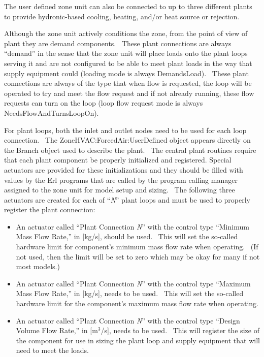 The user defined zone unit can also be connected to up to three different plants to provide hydronic-based cooling, heating, and/or heat source or rejection.

Although the zone unit actively conditions the zone, from the point of view of plant they are demand components.~ These plant connections are always ``demand'' in the sense that the zone unit will place loads onto the plant loops serving it and are not configured to be able to meet plant loads in the way that supply equipment could (loading mode is always DemandsLoad).~ These plant connections are always of the type that when flow is requested, the loop will be operated to try and meet the flow request and if not already running, these flow requests can turn on the loop (loop flow request mode is always NeedsFlowAndTurnsLoopOn).

For plant loops, both the inlet and outlet nodes need to be used for each loop connection.~ The ZoneHVAC:ForcedAir:UserDefined object appears directly on the Branch object used to describe the plant.~ The central plant routines require that each plant component be properly initialized and registered. Special actuators are provided for these initializations and they should be filled with values by the Erl programs that are called by the program calling manager assigned to the zone unit for model setup and sizing.~ The following three actuators are created for each of ``\emph{N}'' plant loops and must be used to properly register the plant connection:

\begin{itemize}
\item
  An actuator called ``Plant Connection \emph{N}'' with the control type ``Minimum Mass Flow Rate,'' in {[}kg/s{]}, should be used.~ This will set the so-called hardware limit for component's minimum mass flow rate when operating.~ (If not used, then the limit will be set to zero which may be okay for many if not most models.)
\item
  An actuator called ``Plant Connection \emph{N}'' with the control type ``Maximum Mass Flow Rate,'' in {[}kg/s{]}, needs to be used.~ This will set the so-called hardware limit for the component's maximum mass flow rate when operating.
\item
  An actuator called ``Plant Connection \emph{N}'' with the control type ``Design Volume Flow Rate,'' in {[}m\(^{3}\)/s{]}, needs to be used.~ This will register the size of the component for use in sizing the plant loop and supply equipment that will need to meet the loads.
\end{itemize}


